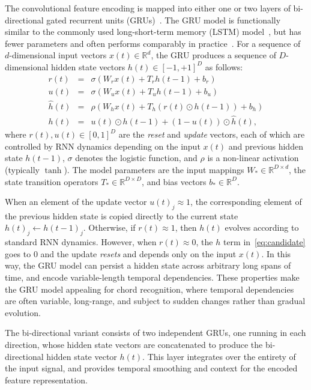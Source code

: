 \documentclass{article}
\begin{document}
The convolutional feature encoding is mapped into either one or two layers of bi-directional gated recurrent units (GRUs)~\cite{cho2014learning}.
The GRU model is functionally similar to the commonly used long-short-term memory (LSTM) model~\cite{hochreiter1997long}, but has fewer parameters and often performs comparably in practice~\cite{jozefowicz2015empirical}.
For a sequence of $d$-dimensional input vectors $x(t) \in \mathbb{R}^d$, the GRU produces a sequence of $D$-dimensional hidden state vectors $h(t) \in {[-1, +1]}^D$ as follows:
\begin{eqnarray}
    r(t) &=& \sigma\left(W_r x(t) + T_r h(t-1) + b_r\right)\\
    u(t) &=& \sigma\left(W_u x(t) + T_u h(t-1) + b_u\right)\\
    \hat{h}(t) &=& \rho\left(W_h x(t) + T_h \left( r(t) \odot h(t-1) \right) + b_h \right)\label{eq:candidate}\\
    h(t) &=& u(t) \odot h(t-1) + (1-u(t)) \odot \hat{h}(t),
\end{eqnarray}
where $r(t), u(t) \in {[0,1]}^D$ are the \emph{reset} and \emph{update} vectors, each of which are controlled by RNN dynamics depending on the input $x(t)$ and previous hidden state $h(t-1)$, $\sigma$ denotes the logistic function, and $\rho$ is a non-linear activation (typically $\tanh$).
The model parameters are the input mappings $W_* \in \mathbb{R}^{D\times d}$, the state transition operators $T_* \in \mathbb{R}^{D\times D}$, and bias vectors $b_* \in \mathbb{R}^D$.

When an element of the update vector ${u(t)}_j \approx 1$, the corresponding element of the previous hidden state is copied directly to the current state ${h(t)}_j \leftarrow {h(t-1)}_j$.
Otherwise, if $r(t) \approx 1$, then $h(t)$ evolves according to standard RNN dynamics.
However, when $r(t) \approx 0$, the $h$ term in~\eqref{eq:candidate} goes to 0 and the update \emph{resets} and depends only on the input $x(t)$.
In this way, the GRU model can persist a hidden state across arbitrary long spans of time, and encode variable-length temporal dependencies.
These properties make the GRU model appealing for chord recognition, where temporal dependencies are often variable, long-range, and subject to sudden changes rather than gradual evolution.

The bi-directional variant consists of two independent GRUs, one running in each direction, whose hidden state vectors are concatenated to produce the bi-directional hidden state vector $h(t)$.
This layer integrates over the entirety of the input signal, and provides temporal smoothing and context for the encoded feature representation.
\end{document}

